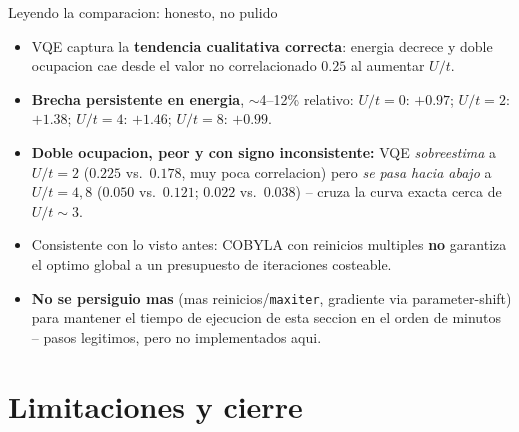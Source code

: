 \documentclass[aspectratio=169,10pt]{beamer}
\newcommand{\good}[1]{\textcolor{qAccent}{\textbf{#1}}}
\newcommand{\warn}[1]{\textcolor{qWarn}{\textbf{#1}}}
\begin{document}
\begin{frame}{Leyendo la comparacion: honesto, no pulido}
  \begin{itemize}
    \item VQE captura la \good{tendencia cualitativa correcta}: energia decrece y doble
      ocupacion cae desde el valor no correlacionado $0.25$ al aumentar $U/t$.
    \item \warn{Brecha persistente en energia}, $\sim$4--12\% relativo:
      $U/t{=}0$: $+0.97$; $U/t{=}2$: $+1.38$; $U/t{=}4$: $+1.46$; $U/t{=}8$: $+0.99$.
    \item \warn{Doble ocupacion, peor y con signo inconsistente:} VQE \emph{sobreestima} a
      $U/t{=}2$ ($0.225$ vs.\ $0.178$, muy poca correlacion) pero \emph{se pasa hacia abajo}
      a $U/t{=}4,8$ ($0.050$ vs.\ $0.121$; $0.022$ vs.\ $0.038$) -- cruza la curva exacta
      cerca de $U/t\sim3$.
    \item Consistente con lo visto antes: COBYLA con reinicios multiples \textbf{no}
      garantiza el optimo global a un presupuesto de iteraciones costeable.
    \item \good{No se persiguio mas} (mas reinicios/\texttt{maxiter}, gradiente via
      parameter-shift) para mantener el tiempo de ejecucion de esta seccion en el orden de
      minutos -- pasos legitimos, pero no implementados aqui.
  \end{itemize}
\end{frame}

\section{Limitaciones y cierre}
\end{document}
